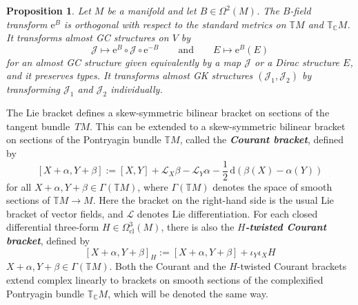 \documentclass[11pt]{article}
\newtheorem{Proposition}[Theorem]{Proposition}
\numberwithin{equation}{section}
\newcommand{\deff}[1]{\textbf{\emph{#1}}}
\newcommand{\pont}[1]{\mathbb{T} {#1}}
\newcommand{\cpont}[1]{\mathbb{T}_{\mathbb{C}} {#1}}
\newcommand{\tang}{T}
\begin{document}
\begin{Proposition}
Let $M$ be a manifold and let $B \in \Omega^2(M)$.
The $B$-field transform $\mathrm{e}^B$ is orthogonal with respect to the standard metrics on $\pont{M}$ and $\cpont{M}$.
It transforms almost GC structures on $V$ by
\[
  \mathcal{J} \mapsto \mathrm{e}^B \circ \mathcal{J} \circ \mathrm{e}^{-B}
  \qquad \text{and} \qquad
   E \mapsto \mathrm{e}^B(E)
\]
for an almost GC structure given equivalently by a map $\mathcal{J}$ or a Dirac structure $E$, and it preserves types.  It transforms almost GK structures $(\mathcal{J}_1,\mathcal{J}_2)$ by transforming $\mathcal{J}_1$ and $\mathcal{J}_2$ individually.
\end{Proposition}


The Lie bracket def\/ines a skew-symmetric bilinear bracket on sections of the tangent bund\-le~$\tang M$.  This can be extended to a skew-symmetric bilinear bracket on sections of the Pontryagin bundle $\pont{M}$, called the \deff{Courant bracket}, def\/ined by
  \[
    [ X+\alpha, Y+\beta ]
    :=
    [X,Y] + \mathcal{L}_X \beta - \mathcal{L}_Y \alpha
    - \frac{1}{2} \, \mathrm{d} \left( \beta(X) - \alpha(Y) \right)
  \]
for all $X+\alpha, Y+\beta \in \Gamma(\pont{M})$, where $\Gamma(\pont{M})$ denotes the space of smooth sections of $\pont{M} \to M$.
Here the bracket on the right-hand side is the usual Lie bracket of vector f\/ields, and $\mathcal{L}$ denotes Lie dif\/ferentiation. For each closed dif\/ferential three-form $H \in \Omega_{\text{cl}}^3(M)$, there is also the \deff{$H$-twisted Courant bracket}, def\/ined by
  \[
    [ X+\alpha, Y+\beta ]_H
    :=
    [ X+\alpha, Y+\beta ]
    + \iota_Y \iota_X H
  \]
$X+\alpha, Y+\beta \in \Gamma(\pont{M})$.
Both the Courant and the $H$-twisted Courant brackets extend complex linearly to brackets on smooth sections of the complexif\/ied Pontryagin bundle $\cpont{M}$, which will be denoted the same way.
\end{document}
